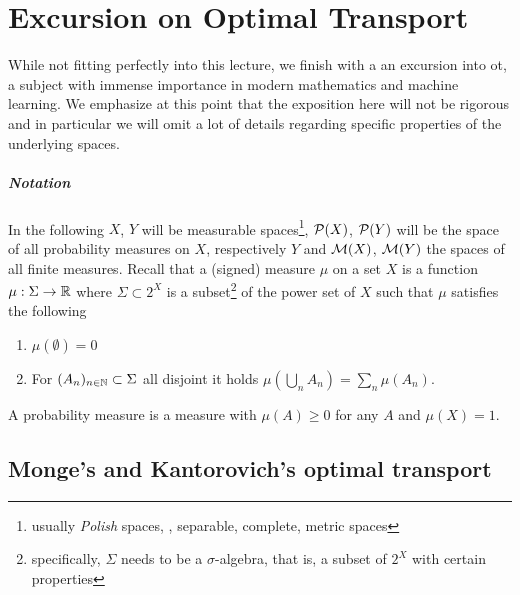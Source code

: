 

\chapter{Excursion on Optimal Transport}
While not fitting perfectly into this lecture, we finish with a an excursion into \gls{ot}, a subject with immense importance in modern mathematics and machine learning. We emphasize at this point that the exposition here will not be rigorous and in particular we will omit a lot of details regarding specific properties of the underlying spaces.

\paragraph{Notation}
In the following $X$, $Y$ will be measurable spaces\footnote{usually \emph{Polish} spaces, \ie, separable, complete, metric spaces}, $\mathcal{P}(X)$, $\mathcal{P}(Y)$ will be the space of all probability measures on $X$, respectively $Y$ and $\mathcal{M}(X)$, $\mathcal{M}(Y)$ the spaces of all finite measures.
Recall that a (signed) measure $\mu$ on a set $X$ is a function $\mu:\Sigma\rightarrow \mathbb{R}$ where $\Sigma\subset 2^X$ is a subset\footnote{specifically, $\Sigma$ needs to be a $\sigma$-algebra, that is, a subset of $2^X$ with certain properties} of the power set of $X$ such that $\mu$ satisfies the following
\begin{enumerate}
    \item $\mu(\emptyset)=0$
    \item For $(A_n)_{n\in \mathbb{N}}\subset\Sigma$ all disjoint it holds $\mu(\bigcup_n A_n) = \sum_n \mu(A_n)$.
\end{enumerate}
A probability measure is a measure with $\mu(A)\geq 0$ for any $A$ and $\mu(X)=1$.

\section{Monge's and Kantorovich's optimal transport}

